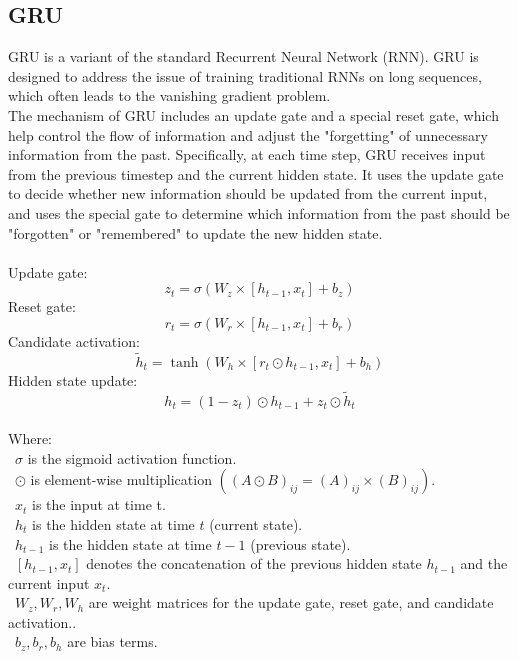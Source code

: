 \documentclass{ieeeojies}
\begin{document}
\subsection{GRU}
GRU \cite{b7} is a variant of the standard Recurrent Neural Network (RNN). GRU is designed to address the issue of training traditional RNNs on long sequences, which often leads to the vanishing gradient problem.\\
The mechanism of GRU includes an update gate and a special reset gate, which help control the flow of information and adjust the "forgetting" of unnecessary information from the past. Specifically, at each time step, GRU receives input from the previous timestep and the current hidden state. It uses the update gate to decide whether new information should be updated from the current input, and uses the special gate to determine which information from the past should be "forgotten" or "remembered" to update the new hidden state.\\
\\
Update gate:
    \[z_t = \sigma(W_z \times [h_{t-1}, x_t] + b_z)\]
Reset gate:
    \[r_t = \sigma\left(W_r \times \left[ h_{t-1}, x_t \right] + b_r \right)\]
Candidate activation:
    \[\tilde{h}_t = \tanh(W_h \times [r_t \odot h_{t-1}, x_t] + b_h)\]
Hidden state update:
    \[h_t = (1 - z_t) \odot h_{t-1} + z_t \odot \tilde{h}_t\]
\\
Where:\\
    \indent\ \(\sigma\) is the sigmoid activation function.\\
    \indent\ \(\odot\) is element-wise multiplication \(((A \odot B)_{ij} = (A)_{ij} \times (B)_{ij})\).\\
    \indent\ \(x_t\) is the input at time t.\\
    \indent\ \(h_t\) is the hidden state at time \(t\) (current state).\\
    \indent\ \(h_{t-1}\) is the hidden state at time \(t-1\) (previous state).\\
    \indent\ \([h_{t-1}, x_t]\) denotes the concatenation of the previous hidden state \(h_{t-1}\) and the current input \(x_t\).\\
    \indent\ \(W_z, W_r, W_h\) are weight matrices for the update gate, reset gate, and candidate activation..\\
    \indent\ \(b_z, b_r, b_h\) are bias terms.
\end{document}
